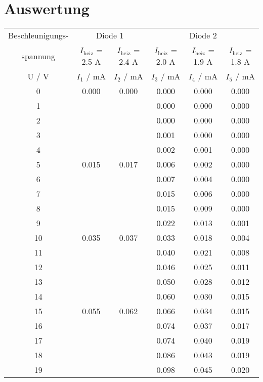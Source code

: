 \section{Auswertung}
\label{sec:Auswertung}

\begin{table}[H]
  \small
  \centering
  \begin{tabular}{c||c|c|c|c|c}
    \toprule
    Beschleunigungs- & \multicolumn{2}{c|}{Diode 1} & \multicolumn{3}{c}{Diode 2} \\
    spannung & $I_\text{heiz}$ = 2.5 A & $I_\text{heiz}$ = 2.4 A & $I_\text{heiz}$ = 2.0 A & $I_\text{heiz}$ = 1.9 A & $I_\text{heiz}$ = 1.8 A \\
    \midrule
    U / V & $I_1$ / mA & $I_2$ / mA & $I_3$ / mA & $I_4$ / mA & $I_5$ / mA \\
    \midrule
    0	  & 0.000 & 0.000 & 0.000	& 0.000	& 0.000 \\
    1	  &       &       & 0.000	& 0.000	& 0.000 \\
    2	  &       &       & 0.000	& 0.000	& 0.000 \\
    3	  &       &       & 0.001	& 0.000	& 0.000 \\
    4	  &       &       & 0.002	& 0.001	& 0.000 \\
    5	  & 0.015 & 0.017 & 0.006	& 0.002	& 0.000 \\
    6	  &       &       & 0.007	& 0.004	& 0.000 \\
    7	  &       &       & 0.015	& 0.006	& 0.000 \\
    8	  &       &       & 0.015	& 0.009	& 0.000 \\
    9	  &       &       & 0.022	& 0.013	& 0.001 \\
    10	& 0.035 & 0.037 & 0.033	& 0.018	& 0.004 \\
    11	&       &       & 0.040	& 0.021	& 0.008 \\
    12	&       &       & 0.046	& 0.025	& 0.011 \\
    13	&       &       & 0.050	& 0.028	& 0.012 \\
    14	&       &       & 0.060	& 0.030	& 0.015 \\
    15	& 0.055 & 0.062 & 0.066	& 0.034	& 0.015 \\
    16	&       &       & 0.074	& 0.037	& 0.017 \\
    17	&       &       & 0.074	& 0.040	& 0.019 \\
    18	&       &       & 0.086	& 0.043	& 0.019 \\
    19	&       &       & 0.098	& 0.045	& 0.020 \\

\end{tabular}
\end{table}
